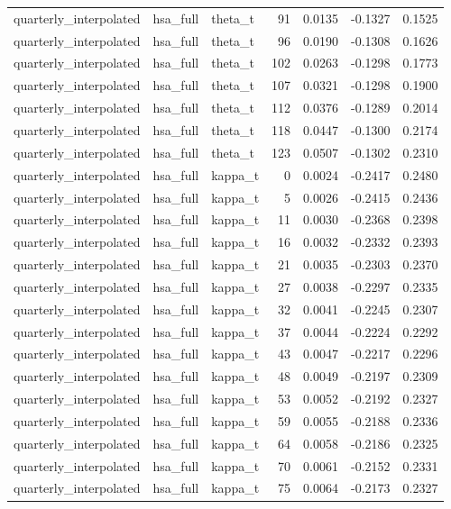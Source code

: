 \begin{tabular}{lllrrrr}
quarterly\_interpolated & hsa\_full & theta\_t & 91 & 0.0135 & -0.1327 & 0.1525 \\
quarterly\_interpolated & hsa\_full & theta\_t & 96 & 0.0190 & -0.1308 & 0.1626 \\
quarterly\_interpolated & hsa\_full & theta\_t & 102 & 0.0263 & -0.1298 & 0.1773 \\
quarterly\_interpolated & hsa\_full & theta\_t & 107 & 0.0321 & -0.1298 & 0.1900 \\
quarterly\_interpolated & hsa\_full & theta\_t & 112 & 0.0376 & -0.1289 & 0.2014 \\
quarterly\_interpolated & hsa\_full & theta\_t & 118 & 0.0447 & -0.1300 & 0.2174 \\
quarterly\_interpolated & hsa\_full & theta\_t & 123 & 0.0507 & -0.1302 & 0.2310 \\
quarterly\_interpolated & hsa\_full & kappa\_t & 0 & 0.0024 & -0.2417 & 0.2480 \\
quarterly\_interpolated & hsa\_full & kappa\_t & 5 & 0.0026 & -0.2415 & 0.2436 \\
quarterly\_interpolated & hsa\_full & kappa\_t & 11 & 0.0030 & -0.2368 & 0.2398 \\
quarterly\_interpolated & hsa\_full & kappa\_t & 16 & 0.0032 & -0.2332 & 0.2393 \\
quarterly\_interpolated & hsa\_full & kappa\_t & 21 & 0.0035 & -0.2303 & 0.2370 \\
quarterly\_interpolated & hsa\_full & kappa\_t & 27 & 0.0038 & -0.2297 & 0.2335 \\
quarterly\_interpolated & hsa\_full & kappa\_t & 32 & 0.0041 & -0.2245 & 0.2307 \\
quarterly\_interpolated & hsa\_full & kappa\_t & 37 & 0.0044 & -0.2224 & 0.2292 \\
quarterly\_interpolated & hsa\_full & kappa\_t & 43 & 0.0047 & -0.2217 & 0.2296 \\
quarterly\_interpolated & hsa\_full & kappa\_t & 48 & 0.0049 & -0.2197 & 0.2309 \\
quarterly\_interpolated & hsa\_full & kappa\_t & 53 & 0.0052 & -0.2192 & 0.2327 \\
quarterly\_interpolated & hsa\_full & kappa\_t & 59 & 0.0055 & -0.2188 & 0.2336 \\
quarterly\_interpolated & hsa\_full & kappa\_t & 64 & 0.0058 & -0.2186 & 0.2325 \\
quarterly\_interpolated & hsa\_full & kappa\_t & 70 & 0.0061 & -0.2152 & 0.2331 \\
quarterly\_interpolated & hsa\_full & kappa\_t & 75 & 0.0064 & -0.2173 & 0.2327 \\

\end{tabular}
